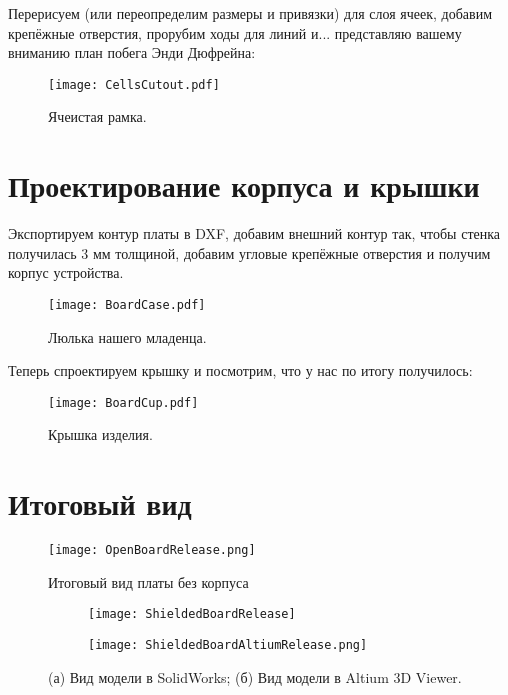 Перерисуем (или переопределим размеры и привязки) для слоя ячеек, добавим крепёжные отверстия, прорубим ходы для линий и...  представляю вашему вниманию план побега Энди Дюфрейна:
\begin{figure}[H]
	\centering
	\texttt{[image: CellsCutout.pdf]}
	\caption{Ячеистая рамка.}%
	\label{fig:CellsCutout}
\end{figure} 
\section{Проектирование корпуса и крышки}
Экспортируем контур платы в DXF, добавим внешний контур так, чтобы стенка получилась 3 мм толщиной, добавим угловые крепёжные отверстия и получим корпус устройства.

\begin{figure}[H]
	\centering
	\texttt{[image: BoardCase.pdf]}
	\caption{Люлька нашего младенца.}%
	\label{fig:BoardCase}
\end{figure} 

Теперь спроектируем крышку и посмотрим, что у нас по итогу получилось:

\begin{figure}[H]
	\centering
	\texttt{[image: BoardCup.pdf]}
	\caption{Крышка изделия.}%
	\label{fig:BoardCup}
\end{figure} 

\section{Итоговый вид}
\begin{figure}[H]
	\centering
	\texttt{[image: OpenBoardRelease.png]}
	\caption{Итоговый вид платы без корпуса}%
	\label{fig:OpenBoardRelease}
\end{figure} 

\begin{figure}[H]
	\centering
	\begin{subfigure}[b]{0.45\textwidth}
		\centering
		\texttt{[image: ShieldedBoardRelease]}
		\caption{}%
		\label{fig:SolidMech}
	\end{subfigure}
	\hfill
	\begin{subfigure}[b]{0.45\textwidth}
		\centering
		\texttt{[image: ShieldedBoardAltiumRelease.png]}
		\caption{}%
		\label{fig:AltMech}
	\end{subfigure}
	\caption{%
		(а) Вид модели в SolidWorks;
		(б) Вид модели в Altium 3D Viewer.
	}%
	\label{fig:MechanicalRelease}
\end{figure}

